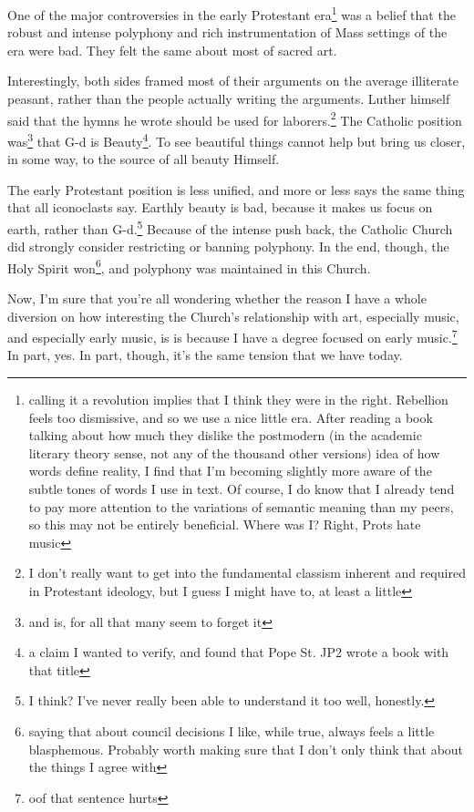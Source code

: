 \documentclass[12pt]{article}[titlepage]
\newcommand{\1}{\={a}}
\newcommand{\2}{\={e}}
\newcommand{\3}{\={\i}}
\newcommand{\4}{\=o}
\newcommand{\5}{\=u}
\newcommand{\6}{\={A}}
\renewcommand{\,}{\textsuperscript{,}}
\begin{document}
One of the major controversies in the early Protestant era\footnote{calling it a revolution implies that I think they were in the right. Rebellion feels too dismissive, and so we use a nice little era. After reading a book talking about how much they dislike the postmodern (in the academic literary theory sense, not any of the thousand other versions) idea of how words define reality, I find that I'm becoming slightly more aware of the subtle tones of words I use in text.
Of course, I do know that I already tend to pay more attention to the variations of semantic meaning than my peers, so this may not be entirely beneficial.
Where was I? Right, Prots hate music} was a belief that the robust and intense polyphony and rich instrumentation of Mass settings of the era were bad.
They felt the same about most of sacred art.
 
Interestingly, both sides framed most of their arguments on the average illiterate peasant, rather than the people actually writing the arguments.
Luther himself said that the hymns he wrote should be used for laborers.\footnote{I don't really want to get into the fundamental classism inherent and required in Protestant ideology, but I guess I might have to, at least a little}
The Catholic position was\footnote{and is, for all that many seem to forget it} that G-d is Beauty\footnote{a claim I wanted to verify, and found that Pope St. JP2 wrote a book with that title}.
To see beautiful things cannot help but bring us closer, in some way, to the source of all beauty Himself.
 
The early Protestant position is less unified, and more or less says the same thing that all iconoclasts say.
Earthly beauty is bad, because it makes us focus on earth, rather than G-d.\footnote{I think? I've never really been able to understand it too well, honestly.}
Because of the intense push back, the Catholic Church did strongly consider restricting or banning polyphony.
In the end, though, the Holy Spirit won\footnote{saying that about council decisions I like, while true, always feels a little blasphemous. Probably worth making sure that I don't only think that about the things I agree with}, and polyphony was maintained in this Church.
 
Now, I'm sure that you're all wondering whether the reason I have a whole diversion on how interesting the Church's relationship with art, especially music, and especially early music, is is because I have a degree focused on early music.\footnote{oof that sentence hurts}
In part, yes.
In part, though, it's the same tension that we have today.
 
\end{document}
